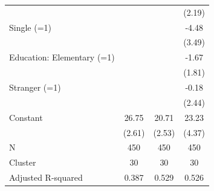 {\begin{tabular}{l*{3}{c}}
                    &                     &                     &      (2.19)         \\
Single (=1)         &                     &                     &       -4.48         \\
                    &                     &                     &      (3.49)         \\
Education: Elementary (=1)&                     &                     &       -1.67         \\
                    &                     &                     &      (1.81)         \\
Stranger (=1)       &                     &                     &       -0.18         \\
                    &                     &                     &      (2.44)         \\
Constant            &       26.75\sym{***}&       20.71\sym{***}&       23.23\sym{***}\\
                    &      (2.61)         &      (2.53)         &      (4.37)         \\
\midrule
N                   &         450         &         450         &         450         \\
Cluster             &          30         &          30         &          30         \\
Adjusted R-squared  &       0.387         &       0.529         &       0.526         \\
\bottomrule
\end{tabular}
}
